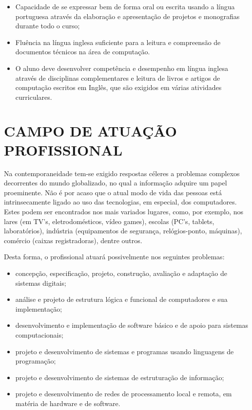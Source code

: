 \documentclass[
	12pt,				%
	openright,			%
  oneside,     %
	a4paper,			%
	chapter=TITLE,		%
	english,			%
	french,				%
	spanish,			%
	brazil				%
	]{abntex2}
\begin{document}
\begin{itemize}
    \item Capacidade de se expressar bem de forma oral ou escrita usando a língua portuguesa através da elaboração e apresentação de projetos e monografias durante todo o curso;
    \item Fluência na língua inglesa suficiente para a leitura e compreensão de documentos técnicos na área de computação.
    \item O aluno deve desenvolver competência e desempenho em língua inglesa através de disciplinas complementares e leitura de livros e artigos de computação escritos em Inglês, que são exigidos em várias atividades curriculares. 
\end{itemize}





%
%


\chapter{CAMPO DE ATUAÇÃO PROFISSIONAL}
\label{cap_campo_de_atuacao_profissional}

Na contemporaneidade tem-se exigido respostas céleres a problemas complexos decorrentes do mundo globalizado, no qual a informação adquire um papel proeminente. Não é por acaso que o atual modo de vida das pessoas está intrinsecamente ligado ao uso das tecnologias, em especial, dos computadores. Estes podem ser encontrados nos mais variados lugares, como, por exemplo, nos lares (em TV's, eletrodomésticos, vídeo games), escolas (PC's, tablets, laboratórios), indústria (equipamentos de segurança, relógios-ponto, máquinas), comércio (caixas registradoras), dentre outros. 

Desta forma, o profissional atuará possivelmente nos seguintes problemas:

\begin{itemize}
    \item concepção, especificação, projeto, construção, avaliação e adaptação de sistemas digitais;
    \item análise e projeto de estrutura lógica e funcional de computadores e sua implementação;
    \item desenvolvimento e implementação de software básico e de apoio para sistemas computacionais;
    \item projeto e desenvolvimento de sistemas e programas usando linguagens de programação;
    \item projeto e desenvolvimento de sistemas de estruturação de informação;
    \item projeto e desenvolvimento de redes de processamento local e remota, em matéria de hardware e de software.    
\end{itemize}
\end{document}

